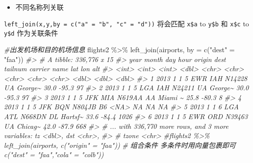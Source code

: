 \documentclass[
]{book}
\newenvironment{Shaded}{\begin{snugshade}}{\end{snugshade}}
\newcommand{\AttributeTok}[1]{\textcolor[rgb]{0.77,0.63,0.00}{#1}}
\newcommand{\CommentTok}[1]{\textcolor[rgb]{0.56,0.35,0.01}{\textit{#1}}}
\newcommand{\FunctionTok}[1]{\textcolor[rgb]{0.00,0.00,0.00}{#1}}
\newcommand{\NormalTok}[1]{#1}
\newcommand{\OtherTok}[1]{\textcolor[rgb]{0.56,0.35,0.01}{#1}}
\newcommand{\SpecialCharTok}[1]{\textcolor[rgb]{0.00,0.00,0.00}{#1}}
\newcommand{\StringTok}[1]{\textcolor[rgb]{0.31,0.60,0.02}{#1}}
\providecommand{\tightlist}{%
  \setlength{\itemsep}{0pt}\setlength{\parskip}{0pt}}
\begin{document}
\begin{itemize}
\tightlist
\item
  不同名称列关联
\end{itemize}

\texttt{left\_join(x,y,by\ =\ c("a"\ =\ "b",\ "c"\ =\ "d"))} 将会匹配 \texttt{x\$a} to \texttt{y\$b} 和 \texttt{x\$c} to \texttt{y\$d} 作为关联条件

\begin{Shaded}
\begin{Highlighting}[]
\CommentTok{\#出发机场和目的机场信息}
\NormalTok{flights2 }\SpecialCharTok{\%\textgreater{}\%} \FunctionTok{left\_join}\NormalTok{(airports, }\AttributeTok{by =} \FunctionTok{c}\NormalTok{(}\StringTok{"dest"} \OtherTok{=} \StringTok{"faa"}\NormalTok{))}
\CommentTok{\#\textgreater{} \# A tibble: 336,776 x 15}
\CommentTok{\#\textgreater{}    year month   day  hour origin dest  tailnum carrier name      lat   lon   alt}
\CommentTok{\#\textgreater{}   \textless{}int\textgreater{} \textless{}int\textgreater{} \textless{}int\textgreater{} \textless{}dbl\textgreater{} \textless{}chr\textgreater{}  \textless{}chr\textgreater{} \textless{}chr\textgreater{}   \textless{}chr\textgreater{}   \textless{}chr\textgreater{}   \textless{}dbl\textgreater{} \textless{}dbl\textgreater{} \textless{}dbl\textgreater{}}
\CommentTok{\#\textgreater{} 1  2013     1     1     5 EWR    IAH   N14228  UA      George\textasciitilde{}  30.0 {-}95.3    97}
\CommentTok{\#\textgreater{} 2  2013     1     1     5 LGA    IAH   N24211  UA      George\textasciitilde{}  30.0 {-}95.3    97}
\CommentTok{\#\textgreater{} 3  2013     1     1     5 JFK    MIA   N619AA  AA      Miami \textasciitilde{}  25.8 {-}80.3     8}
\CommentTok{\#\textgreater{} 4  2013     1     1     5 JFK    BQN   N804JB  B6      \textless{}NA\textgreater{}     NA    NA      NA}
\CommentTok{\#\textgreater{} 5  2013     1     1     6 LGA    ATL   N668DN  DL      Hartsf\textasciitilde{}  33.6 {-}84.4  1026}
\CommentTok{\#\textgreater{} 6  2013     1     1     5 EWR    ORD   N39463  UA      Chicag\textasciitilde{}  42.0 {-}87.9   668}
\CommentTok{\#\textgreater{} \# ... with 336,770 more rows, and 3 more variables: tz \textless{}dbl\textgreater{}, dst \textless{}chr\textgreater{},}
\CommentTok{\#\textgreater{} \#   tzone \textless{}chr\textgreater{}}
\CommentTok{\#flights2 \%\textgreater{}\% left\_join(airports, c("origin" = "faa"))}
\CommentTok{\# 组合条件 多条件时用向量包裹即可c("dest" = "faa","cola" = "colb"))}
\end{Highlighting}
\end{Shaded}
\end{document}
